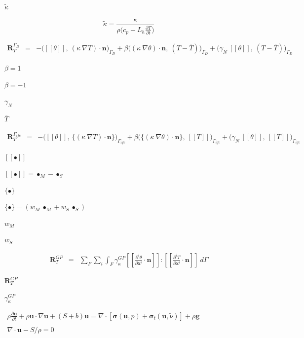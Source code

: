 \documentclass{article}
\begin{document}
$ \tilde{\kappa} $
\pagebreak

\[ \tilde{\kappa} = \frac{\kappa}{ \rho \bigg( c_p + L_h \frac{\partial T}{\partial t} \bigg) } \]
\pagebreak

\[
\begin{array}{lll}
\mathbf{R}_{T}^{\Gamma_{D}} & = & \displaystyle
- \bigg( [[\theta]],\ ( \kappa\ \nabla T ) \cdot \mathbf{n}  \bigg)_{\Gamma_{D}}
+ \beta \bigg( ( \kappa\ \nabla \theta ) \cdot \mathbf{n},\ ( T - \overline{T} ) \bigg)_{\Gamma_{D}}
+ \bigg( \gamma_N\ [[ \theta ]],\ ( T - \overline{T} ) \bigg)_{\Gamma_{D}}
\end{array}
\]
\pagebreak

$ \beta = 1 $
\pagebreak

$ \beta = -1 $
\pagebreak

$ \gamma_N $
\pagebreak

$ \overline{T} $
\pagebreak

\[
\begin{array}{lll}
\mathbf{R}_{T}^{\Gamma_{ifc}} & = & \displaystyle
- \bigg( [[\theta]],\ \{( \kappa\ \nabla T ) \cdot \mathbf{n} \} \bigg)_{\Gamma_{ifc}}
+ \beta \bigg( \{ ( \kappa\ \nabla \theta ) \cdot \mathbf{n} \},\ [[T]] \bigg)_{\Gamma_{ifc}}
+ \bigg( \gamma_N\ [[ \theta ]],\ [[ T ]] \bigg)_{\Gamma_{ifc}}
\end{array}
\]
\pagebreak

$ [[ \bullet ]] $
\pagebreak

$ [[ \bullet ]]  = \bullet_M - \bullet_S $
\pagebreak

$ \{ \bullet \} $
\pagebreak

$ \{ \bullet \}  = ( w_M\ \bullet_M + w_S\ \bullet_S ) $
\pagebreak

$ w_M $
\pagebreak

$ w_S $
\pagebreak

\[
\begin{array}{lll}
\mathbf{R}_{T}^{GP} & = & \displaystyle
\sum_{F} \sum_{i} \int_{F} \gamma_{\kappa}^{GP} [[ \frac{\partial^i \theta }{\partial \mathbf{x}^i} \cdot \mathbf{n} ]] 
: [[ \frac{\partial^i T}{\partial \mathbf{x}^i} \cdot \mathbf{n} ]]\ d\Gamma
\end{array}
\]
\pagebreak

$ \mathbf{R}_{T}^{GP} $
\pagebreak

$ \gamma_{\kappa}^{GP} $
\pagebreak

$
\begin{array}{l}
\displaystyle
\rho \frac{\partial \mathbf{u}}{\partial t} 
+ \rho \mathbf{u} \cdot \nabla \mathbf{u} + \left( { S + b } \right) \mathbf{u} 
= \nabla \cdot \left[ \boldsymbol{\sigma}(\mathbf{u}, p) 
+ \boldsymbol{\sigma}_t( \mathbf{u}, \tilde{\nu}) \right] 
+ \rho \mathbf{g}\\\\[15pt]

\displaystyle
\nabla \cdot \mathbf{u} - S / \rho= 0
\end{array}
$
\pagebreak
\end{document}
